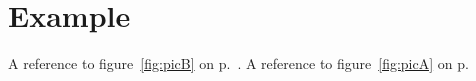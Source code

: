 \documentclass{article}
\begin{document}
\section{Example}
\Blindtext[3]
\Blindtext[3]
A reference to figure~\ref{fig:picB} on p.~\pageref{fig:picB}.
\renewcommand{\leftpagecontent}{
 \begin{figure}
   \centering
   \rule{3cm}{2cm}
   \caption{A second picture.}
   \label{fig:picB}
 \end{figure}
 \begin{figure}
   \centering
   \rule{4cm}{5cm}
   \caption{A third picture.}
   \label{fig:picC}
 \end{figure}
}
\Blindtext[6]
A reference to figure~\ref{fig:picA} on p.~\pageref{fig:picA}
\semionesideoff
\end{document}
